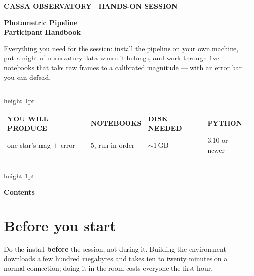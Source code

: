 \documentclass[11pt,a4paper]{article}
\newcommand{\thead}[1]{{\sffamily\bfseries\scriptsize\color{inkfaint}\MakeUppercase{#1}}}
\begin{document}
\thispagestyle{empty}
\begin{flushleft}
{\sffamily\bfseries\scriptsize\color{accent}\MakeUppercase{CASSA Observatory \textbullet\ Hands-on session}}\par
\vspace{10pt}
{\sffamily\bfseries\fontsize{28}{32}\selectfont Photometric Pipeline\\Participant Handbook}\par
\vspace{14pt}
{\large\color{inksoft} Everything you need for the session: install the pipeline on your own
machine, put a night of observatory data where it belongs, and work through five notebooks
that take raw frames to a calibrated magnitude --- with an error bar you can defend.}\par
\vspace{20pt}
{\color{rule}\hrule height 1pt}
\vspace{10pt}
\begin{tabularx}{\textwidth}{@{}XXXX@{}}
\thead{You will produce} & \thead{Notebooks} & \thead{Disk needed} & \thead{Python} \\
{\sffamily\small one star's mag $\pm$ error} & {\sffamily\small 5, run in order} &
{\sffamily\small $\sim$1\,GB} & {\sffamily\small 3.10 or newer} \\
\end{tabularx}
\vspace{6pt}
{\color{rule}\hrule height 1pt}
\end{flushleft}

\vspace{18pt}
{\sffamily\bfseries\large Contents}\vspace{-14pt}
\begin{small}
\renewcommand{\contentsname}{}
\setcounter{tocdepth}{1}
\tableofcontents
\end{small}

\clearpage

\section{Before you start}
Do the install \textbf{before} the session, not during it. Building the environment downloads a
few hundred megabytes and takes ten to twenty minutes on a normal connection; doing it in the
room costs everyone the first hour.
\end{document}
